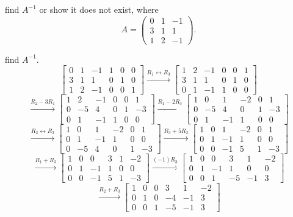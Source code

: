 \documentclass[12pt]{article}
\begin{document}
find $A^{-1}$ or show it does not exist, where
\[
A = \begin{pmatrix} 0 & 1 & -1 \\ 3 & 1 & 1 \\ 1 & 2 & -1 \end{pmatrix}.
\]

find $A^{-1}$.
\[
\left[\begin{array}{rrr|rrr}
0 & 1 & -1 & 1 & 0 & 0 \\
3 & 1 & 1 & 0 & 1 & 0 \\
1 & 2 & -1 & 0 & 0 & 1
\end{array}\right]
\xrightarrow{R_1 \leftrightarrow R_3}
\left[\begin{array}{rrr|rrr}
1 & 2 & -1 & 0 & 0 & 1 \\
3 & 1 & 1 & 0 & 1 & 0 \\
0 & 1 & -1 & 1 & 0 & 0
\end{array}\right]
\]
\[
\xrightarrow{R_2 - 3R_1}
\left[\begin{array}{rrr|rrr}
1 & 2 & -1 & 0 & 0 & 1 \\
0 & -5 & 4 & 0 & 1 & -3 \\
0 & 1 & -1 & 1 & 0 & 0
\end{array}\right]
\xrightarrow{R_1 - 2R_3}
\left[\begin{array}{rrr|rrr}
1 & 0 & 1 & -2 & 0 & 1 \\
0 & -5 & 4 & 0 & 1 & -3 \\
0 & 1 & -1 & 1 & 0 & 0
\end{array}\right]
\]
\[
\xrightarrow{R_2 \leftrightarrow R_3}
\left[\begin{array}{rrr|rrr}
1 & 0 & 1 & -2 & 0 & 1 \\
0 & 1 & -1 & 1 & 0 & 0 \\
0 & -5 & 4 & 0 & 1 & -3
\end{array}\right]
\xrightarrow{R_3 + 5R_2}
\left[\begin{array}{rrr|rrr}
1 & 0 & 1 & -2 & 0 & 1 \\
0 & 1 & -1 & 1 & 0 & 0 \\
0 & 0 & -1 & 5 & 1 & -3
\end{array}\right]
\]
\[
\xrightarrow{R_1 + R_3}
\left[\begin{array}{rrr|rrr}
1 & 0 & 0 & 3 & 1 & -2 \\
0 & 1 & -1 & 1 & 0 & 0 \\
0 & 0 & -1 & 5 & 1 & -3
\end{array}\right]
\xrightarrow{(-1)R_3}
\left[\begin{array}{rrr|rrr}
1 & 0 & 0 & 3 & 1 & -2 \\
0 & 1 & -1 & 1 & 0 & 0 \\
0 & 0 & 1 & -5 & -1 & 3
\end{array}\right]
\]
\[
\xrightarrow{R_2 + R_3}
\left[\begin{array}{rrr|rrr}
1 & 0 & 0 & 3 & 1 & -2 \\
0 & 1 & 0 & -4 & -1 & 3 \\
0 & 0 & 1 & -5 & -1 & 3
\end{array}\right]
\]
\end{document}
